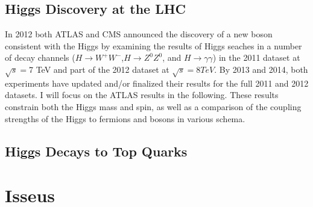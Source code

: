 \subsection{Higgs Discovery at the LHC}

In 2012 both ATLAS and CMS announced the discovery of a new boson consistent with the Higgs by examining the results of Higgs seaches in a number
of decay channels ($H\rightarrow W^+W^-$,$H\rightarrow Z^0Z^0$, and $H\rightarrow\gamma\gamma$) in the 2011 dataset at $\sqrt{s}=$7 TeV and
part of the 2012 dataset at $\sqrt{s}=8 TeV$. By 2013 and 2014, both experiments have updated and/or finalized their results for the 
full 2011 and 2012 datasets. I will focus on the ATLAS results in the following. These results constrain both the Higgs mass and
spin, as well as a comparison of the coupling strengths of the Higgs to fermions and bosons in various schema. 





\subsection{Higgs Decays to Top Quarks}

\section{Isseus }
